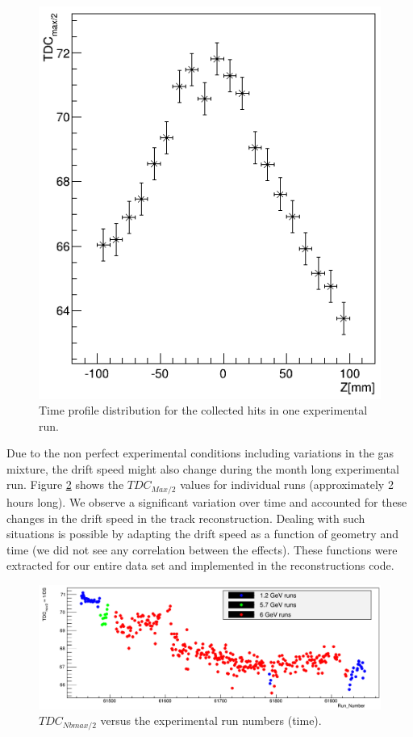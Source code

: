\documentclass[twocolumn,showpacs,superscriptaddress,groupedaddress]{revtex4}
\begin{document}
\begin{figure}[tb]
\centering
\includegraphics[scale=0.36]{fig/RunNumber_61551_TDCmax_Zslice.png}
\caption{Time profile distribution for the collected hits in one experimental 
run. } \label{fig:RunNumber_61551_TDCmax_Zslice}
\end{figure}

Due to the non perfect experimental conditions including variations in the 
gas mixture, the drift speed might also change during the month long experimental run.  
Figure \ref{fig:Drift_run_number_1} shows the $TDC_{Max/2}$ values for 
individual runs (approximately 2 hours long). We observe a significant 
variation over time and accounted for these changes in the drift speed in the
track reconstruction. Dealing with such situations is 
possible by adapting the drift speed as a function of 
geometry and time (we did not see any correlation between the effects). These 
functions were extracted for our entire data set and implemented in the 
reconstructions code.

\begin{figure}[tb]
\hspace*{-1.8cm}
\includegraphics[scale=0.26]{fig/Drift_run_number_1.png}
\caption{$TDC_{Nbmax/2}$ versus the experimental run numbers (time).  } 
\label{fig:Drift_run_number_1}
\end{figure}
\end{document}
